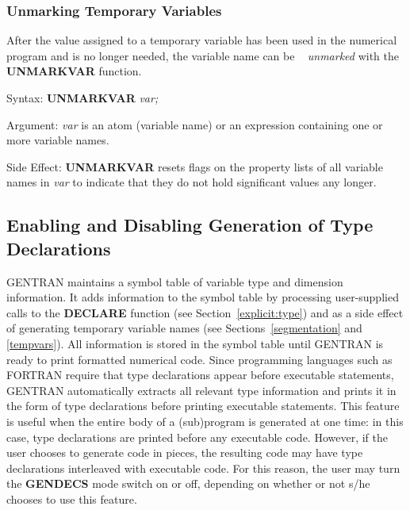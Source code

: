 \subsubsection{Unmarking Temporary Variables}
 
After the value assigned to a temporary variable has been used
in the numerical program and is no longer needed, the variable name can be \
{\it unmarked} with the {\bf UNMARKVAR} function.
\begin{describe}{Syntax:}
{\bf UNMARKVAR} {\it  var;}
\end{describe}
\begin{describe}{Argument:}
{\it var} is an atom (variable name) or an expression containing one or more
variable names.
\end{describe}
\begin{describe}{Side Effect:}
{\bf UNMARKVAR} resets flags on the property lists of all variable names in 
{\it var} to indicate that they do not hold significant values any longer.
\end{describe}

\subsection{Enabling and Disabling Generation of Type Declarations}
\label{control:type}
GENTRAN maintains a symbol table of variable type and dimension
information.  It adds information to the symbol table by processing
user-supplied calls to the {\bf DECLARE} function (see
Section~\ref{explicit:type}) and as a
side effect of generating temporary variable names 
(see Sections~\ref{segmentation} and \ref{tempvars}).
All information is stored in the symbol table until GENTRAN is ready
to print formatted numerical code.  Since programming languages such as
FORTRAN require that type declarations appear before executable statements,
GENTRAN automatically extracts all relevant type information and prints it
in the form of type declarations before printing executable
statements.  This feature is useful when the entire body of a (sub)program is
generated at one time:  in this case, type declarations are printed
before any executable code.  However, if the user chooses to generate code
in pieces, the resulting code may have type declarations interleaved
\index{GENDECS switch}
with executable code.  For this reason, the user may turn the {\bf GENDECS}
mode switch on or off, depending on whether or not s/he chooses to use
this feature.


